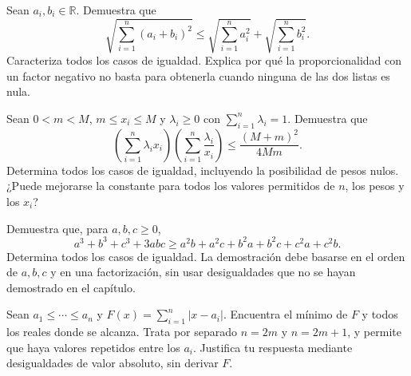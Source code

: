 \begin{samepage}
\begin{problem}\label{prob:reto-absoluto-06}
Sean $a_i,b_i\in\mathbb R$. Demuestra que
\[
\sqrt{\sum_{i=1}^n(a_i+b_i)^2}
\le\sqrt{\sum_{i=1}^n a_i^2}+\sqrt{\sum_{i=1}^n b_i^2}.
\]
Caracteriza todos los casos de igualdad. Explica por qué la proporcionalidad con un factor negativo no basta para obtenerla cuando ninguna de las dos listas es nula.
\end{problem}
\end{samepage}
\par{}

\begin{samepage}
\begin{problem}\label{prob:reto-absoluto-07}
Sean $0<m<M$, $m\le x_i\le M$ y $\lambda_i\ge0$ con $\sum_{i=1}^n\lambda_i=1$. Demuestra que
\[
\left(\sum_{i=1}^n\lambda_i x_i\right)
\left(\sum_{i=1}^n\frac{\lambda_i}{x_i}\right)
\le\frac{(M+m)^2}{4Mm}.
\]
Determina todos los casos de igualdad, incluyendo la posibilidad de pesos nulos. ¿Puede mejorarse la constante para todos los valores permitidos de $n$, los pesos y los $x_i$? \cite{mseKantorovich}
\end{problem}
\end{samepage}
\par{}

\begin{samepage}
\begin{problem}\label{prob:reto-absoluto-08}
Demuestra que, para $a,b,c\ge0$,
\[
a^3+b^3+c^3+3abc
\ge a^2b+a^2c+b^2a+b^2c+c^2a+c^2b.
\]
Determina todos los casos de igualdad. La demostración debe basarse en el orden de $a,b,c$ y en una factorización, sin usar desigualdades que no se hayan demostrado en el capítulo.~\cite{mseSchur}
\end{problem}
\end{samepage}
\par{}

\begin{samepage}
\begin{problem}\label{prob:reto-absoluto-09}
Sean $a_1\le\cdots\le a_n$ y $F(x)=\sum_{i=1}^n|x-a_i|$. Encuentra el mínimo de $F$ y todos los reales donde se alcanza. Trata por separado $n=2m$ y $n=2m+1$, y permite que haya valores repetidos entre los $a_i$. Justifica tu respuesta mediante desigualdades de valor absoluto, sin derivar $F$.~\cite{mseMediana}
\end{problem}
\end{samepage}
\par{}

